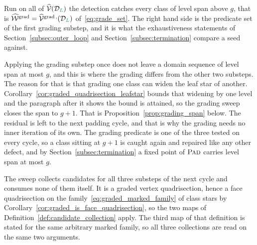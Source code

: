 \documentclass[a4paper, 12pt]{article}
\makeatletter
\DeclareRobustCommand{\gradeClasses}[1][]{\widehat{\V}^{\mathrm{grad} \, \ifx\@empty#1\@empty\else,#1\fi}}
\newcommand{\green}{\color{ForestGreen}}
\newcommand{\V}{\mathcal{V}}
\newcommand{\vertexClasses}{\widehat{\V}}
\DeclareRobustCommand{\markedVertexClasses}[1][]{\widehat{\mathcal{W}}\ifx\@empty#1\@empty\else^{#1}\fi}
\renewcommand{\L}{{\green L}}
\theoremstyle{definition}
\theoremstyle{plain}
\numberwithin{equation}{section}
\DeclareRobustCommand{\domseq}[1][]{\mathcal{D}\ifx\@empty#1\@empty\else_{#1}\fi}
\makeatother
\begin{document}
Run on all of $\vertexClasses(\domseq[\L])$ the detection catches every class of level span above $g$, that is $\markedVertexClasses[\mathrm{grad}] = \gradeClasses(\domseq[\L])$ of~\eqref{eq:grade_set}. The right hand side is the predicate set of the first grading substep, and it is what the exhaustiveness statements of Section~\ref{subsec:outer_loop} and Section~\ref{subsec:termination} compare a seed against.

Applying the grading substep once does not leave a domain sequence of level span at most $g$, and this is where the grading differs from the other two substeps. The reason for that is that grading one class can widen the leaf star of another. Corollary~\ref{cor:graded_quadrisection_leafstar} bounds that widening by one level and the paragraph after it shows the bound is attained, so the grading sweep closes the span to $g \! + \! 1$. That is Proposition~\ref{prop:grading_span} below. The residual is left to the next padding cycle, and that is why the grading needs no inner iteration of its own. The grading predicate is one of the three tested on every cycle, so a class sitting at $g \! + \! 1$ is caught again and repaired like any other defect, and by Section~\ref{subsec:termination} a fixed point of $\textsc{Pad}$ carries level span at most $g$.

The sweep collects candidates for all three substeps of the next cycle and consumes none of them itself. It is a graded vertex quadrisection, hence a face quadrisection on the family~\eqref{eq:graded_marked_family} of class stars by Corollary~\ref{cor:graded_is_face_quadrisection}, so the two maps of Definition~\ref{def:candidate_collection} apply. The third map of that definition is stated for the same arbitrary marked family, so all three collections are read on the same two arguments.
\end{document}
